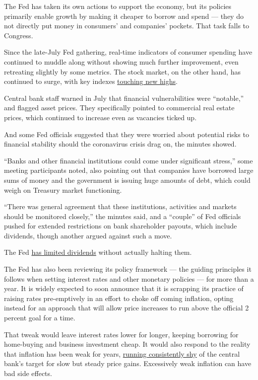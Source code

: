 The Fed has taken its own actions to support the economy, but its
policies primarily enable growth by making it cheaper to borrow and
spend --- they do not directly put money in consumers' and companies'
pockets. That task falls to Congress.

Since the late-July Fed gathering, real-time indicators of consumer
spending have continued to muddle along without showing much further
improvement, even retreating slightly by some metrics. The stock market,
on the other hand, has continued to surge, with key indexes
\href{https://www.nytimes3xbfgragh.onion/2020/08/18/business/stock-market-record.html}{touching
new highs}.

Central bank staff warned in July that financial vulnerabilities were
``notable,'' and flagged asset prices. They specifically pointed to
commercial real estate prices, which continued to increase even as
vacancies ticked up.

And some Fed officials suggested that they were worried about potential
risks to financial stability should the coronavirus crisis drag on, the
minutes showed.

``Banks and other financial institutions could come under significant
stress,'' some meeting participants noted, also pointing out that
companies have borrowed large sums of money and the government is
issuing huge amounts of debt, which could weigh on Treasury market
functioning.

``There was general agreement that these institutions, activities and
markets should be monitored closely,'' the minutes said, and a
``couple'' of Fed officials pushed for extended restrictions on bank
shareholder payouts, which include dividends, though another argued
against such a move.

The Fed
\href{https://www.nytimes3xbfgragh.onion/2020/06/25/business/economy/fed-dividend-buyback-limits.html}{has
limited dividends} without actually halting them.

The Fed has also been reviewing its policy framework --- the guiding
principles it follows when setting interest rates and other monetary
policies --- for more than a year. It is widely expected to soon
announce that it is scrapping its practice of raising rates
pre-emptively in an effort to choke off coming inflation, opting instead
for an approach that will allow price increases to run above the
official 2 percent goal for a time.

That tweak would leave interest rates lower for longer, keeping
borrowing for home-buying and business investment cheap. It would also
respond to the reality that inflation has been weak for years,
\href{https://fred.stlouisfed.org/series/PCEPILFE}{running consistently
shy} of the central bank's target for slow but steady price gains.
Excessively weak inflation can have bad side effects.


